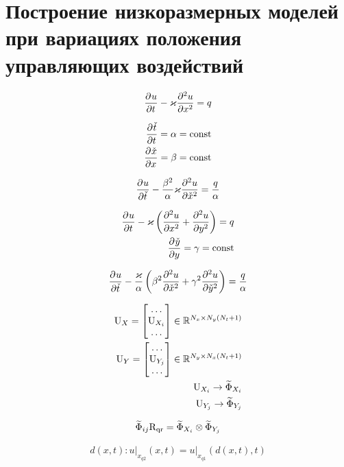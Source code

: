 \chapter{Построение низкоразмерных моделей при вариациях положения управляющих воздействий}\label{ch:ch3}


\begin{equation}
    \deriv{u}{t} - \varkappa \deriv[2]{u}{x} = q
\end{equation}

\begin{align}
    \deriv{\check{t}}{t} = \alpha = \text{const} \\
    \deriv{\check{x}}{x} = \beta = \text{const} \\
\end{align}

\begin{equation}
    \deriv{u}{\check{t}} - \frac{\beta^2}{\alpha} \varkappa \deriv[2]{u}{\check{x}} = \frac{q}{\alpha}
\end{equation}

\begin{align}
    \deriv{u}{t} - \varkappa \left(\deriv[2]{u}{x} + \deriv[2]{u}{y} \right) = q \\
    \deriv{\check{y}}{y} = \gamma = \text{const}
\end{align}

\begin{equation}
    \deriv{u}{\check{t}} - \frac{\varkappa }{\alpha} \left(
        \beta^2 \deriv[2]{u}{\check{x}} + \gamma^2 \deriv[2]{u}{\check{y}}
        \right) = \frac{q}{\alpha}
\end{equation}

\begin{align}
    \matr{U}_{X} = \begin{bmatrix}
        \dots \\
        \matr{U}_{X_i}\\
         \dots
    \end{bmatrix}
    \in \mathbb{R}^{N_x \times N_y (N_{t}+1)} \\
    \matr{U}_{Y} = \begin{bmatrix}
        \dots \\
        \matr{U}_{Y_j}\\
         \dots
    \end{bmatrix}
    \in \mathbb{R}^{N_y \times N_x (N_{t}+1)} \\
    \matr{U}_{X_i} \rightarrow \widetilde{\Phi}_{X_i} \\
    \matr{U}_{Y_j} \rightarrow \widetilde{\Phi}_{Y_j}
\end{align}

\begin{align}
    \widetilde{\Phi}_{ij} \matr{R}_\text{qr}
    = \widetilde{\Phi}_{X_i} \otimes \widetilde{\Phi}_{Y_j} \\
\end{align}

\begin{align}
    d(x,t) : \left. u \right\vert_{x_{q2}}(x,t) = \left. u \right\vert_{x_{q1}}(d(x,t),t)
\end{align}
